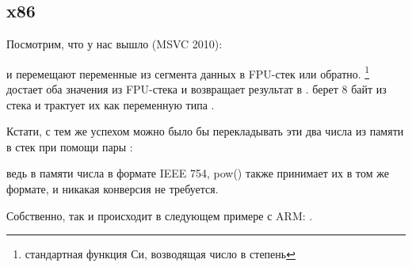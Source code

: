\subsection{x86}

Посмотрим, что у нас вышло (MSVC 2010):



\FLD и \FSTP перемещают переменные из сегмента данных в FPU-стек или обратно. 
\footnote{стандартная функция Си, возводящая число в степень} достает оба значения из FPU-стека и 
возвращает результат в . 
\printf берет 8 байт из стека и трактует их как переменную типа \Tdouble.

\ifdefined\IncludeARM
Кстати, с тем же успехом можно было бы перекладывать эти два числа из памяти в стек при помощи пары \MOV:
 
ведь в памяти числа в формате IEEE 754, pow() также принимает их в том же
формате, и никакая конверсия не требуется.

Собственно, так и происходит в следующем примере с ARM: .
\fi

